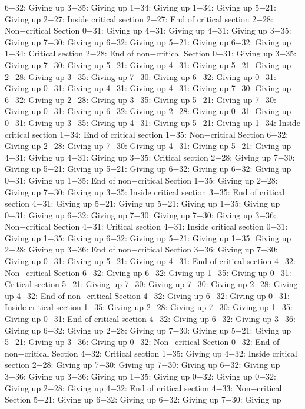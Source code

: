 6−32: Giving up
3−35: Giving up
1−34: Giving up
1−34: Giving up
5−21: Giving up
2−27: Inside critical section
2−27: End of critical section
2−28: Non−critical Section
0−31: Giving up
4−31: Giving up
4−31: Giving up
3−35: Giving up
7−30: Giving up
6−32: Giving up
5−21: Giving up
6−32: Giving up
1−34: Critical section
2−28: End of non−critical Section
0−31: Giving up
3−35: Giving up
7−30: Giving up
5−21: Giving up
4−31: Giving up
5−21: Giving up
2−28: Giving up
3−35: Giving up
7−30: Giving up
6−32: Giving up
0−31: Giving up
0−31: Giving up
4−31: Giving up
4−31: Giving up
7−30: Giving up
6−32: Giving up
2−28: Giving up
3−35: Giving up
5−21: Giving up
7−30: Giving up
0−31: Giving up
6−32: Giving up
2−28: Giving up
0−31: Giving up
0−31: Giving up
3−35: Giving up
4−31: Giving up
5−21: Giving up
1−34: Inside critical section
1−34: End of critical section
1−35: Non−critical Section
6−32: Giving up
2−28: Giving up
7−30: Giving up
4−31: Giving up
5−21: Giving up
4−31: Giving up
4−31: Giving up
3−35: Critical section
2−28: Giving up
7−30: Giving up
5−21: Giving up
5−21: Giving up
6−32: Giving up
6−32: Giving up
0−31: Giving up
1−35: End of non−critical Section
1−35: Giving up
2−28: Giving up
7−30: Giving up
3−35: Inside critical section
3−35: End of critical section
4−31: Giving up
5−21: Giving up
5−21: Giving up
1−35: Giving up
0−31: Giving up
6−32: Giving up
7−30: Giving up
7−30: Giving up
3−36: Non−critical Section
4−31: Critical section
4−31: Inside critical section
0−31: Giving up
1−35: Giving up
6−32: Giving up
5−21: Giving up
1−35: Giving up
2−28: Giving up
3−36: End of non−critical Section
3−36: Giving up
7−30: Giving up
0−31: Giving up
5−21: Giving up
4−31: End of critical section
4−32: Non−critical Section
6−32: Giving up
6−32: Giving up
1−35: Giving up
0−31: Critical section
5−21: Giving up
7−30: Giving up
7−30: Giving up
2−28: Giving up
4−32: End of non−critical Section
4−32: Giving up
6−32: Giving up
0−31: Inside critical section
1−35: Giving up
2−28: Giving up
7−30: Giving up
1−35: Giving up
0−31: End of critical section
4−32: Giving up
6−32: Giving up
3−36: Giving up
6−32: Giving up
2−28: Giving up
7−30: Giving up
5−21: Giving up
5−21: Giving up
3−36: Giving up
0−32: Non−critical Section
0−32: End of non−critical Section
4−32: Critical section
1−35: Giving up
4−32: Inside critical section
2−28: Giving up
7−30: Giving up
7−30: Giving up
6−32: Giving up
3−36: Giving up
3−36: Giving up
1−35: Giving up
0−32: Giving up
0−32: Giving up
2−28: Giving up
4−32: End of critical section
4−33: Non−critical Section
5−21: Giving up
6−32: Giving up
6−32: Giving up
7−30: Giving up
